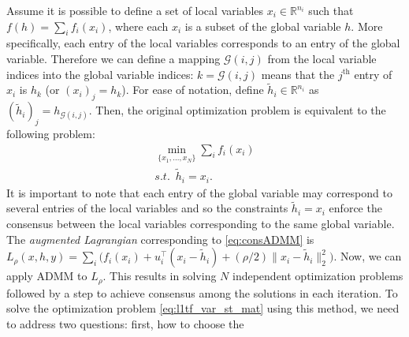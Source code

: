 \documentclass{article}
\DeclareMathOperator*{\argmin}{argmin}
\newcommand{\attn}[1]{\textcolor{red}{TODO: #1}}
\newcommand{\norm}[1]{\left\lVert #1 \right\rVert}
\begin{document}
Assume it is possible to define a set of local variables
$x_i \in \mathbb{R}^{n_i}$ such that $f(h)=\sum_i f_i(x_i)$, where
each $x_i$ is a subset of the global variable $h$. More specifically,
each entry of the local variables corresponds to an entry of the
global variable. Therefore we can define a mapping $\mathscr{G}(i,j)$
from the local variable indices into the global variable indices:
$k=\mathscr{G}(i,j)$ means that the $j^\text{th}$ entry of $x_i$ is
$h_k$ (or $(x_i)_j=h_k$). For ease of notation, define $\tilde{h}_i
\in \mathbb{R}^{n_i}$ as $(\tilde{h}_i)_j=h_{\mathscr{G}(i,j)}$. Then,
the original optimization problem is equivalent to the following
problem:  
\begin{equation}
\begin{aligned}
\min_{\{x_1,...,x_N  \}} \sum_i f_i(x_i)\\
 s.t. \,\,\, \tilde{h}_i=x_i. \,\,\,\,\,\,
\end{aligned}
\label{eq:consADMM}
\end{equation}
It is important to note that each entry of the global variable may
correspond to several entries of the local variables and so the
constraints $\tilde{h}_i=x_i$ enforce the consensus between the local
variables corresponding to the same global variable.  
The \textit{augmented Lagrangian} corresponding to 
\eqref{eq:consADMM} is $L_\rho(x,h,y)=\sum_i
\big(f_i(x_i)+u_i^\top(x_i-\tilde{h}_i) + (\rho/2) \lVert
x_i-\tilde{h}_i \lVert_2^2 \big)$. Now, we can apply ADMM to $L_\rho$. This results in solving $N$ independent optimization problems followed by a step to achieve consensus among the solutions in each iteration.
To solve the optimization problem \eqref{eq:l1tf_var_st_mat} using
this method, we need to address two 
questions: first, how to choose the 
\end{document}
